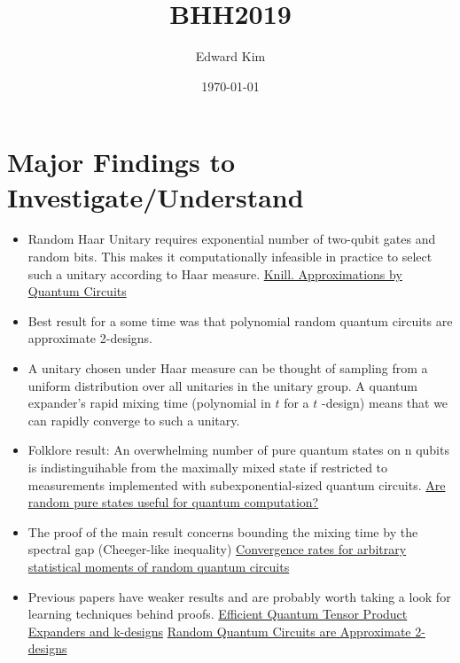 \documentclass[a4paper]{article}
\author{Edward Kim}
\date{\today}
\title{BHH2019}
\begin{document}
\maketitle
\tableofcontents


\section{Major Findings to Investigate/Understand}
\label{sec:orgac81dc7}
\begin{itemize}
\item Random Haar Unitary requires exponential number of two-qubit gates and random bits.
This makes it computationally infeasible in practice to select such a unitary according to Haar measure.
\href{https://arxiv.org/pdf/quant-ph/9508006.pdf}{Knill. Approximations by Quantum Circuits}

\item Best result for a some time was that polynomial random quantum circuits are approximate 2-designs.
\item A unitary chosen under Haar measure can be thought of sampling from a uniform distribution over all unitaries in the unitary group.
A quantum expander's rapid mixing time (polynomial in \(t\) for a \(t\) -design) means that we can rapidly converge to such a unitary.

\item Folklore result: An overwhelming number of pure quantum states on n qubits is indistinguihable from the maximally mixed state if restricted to measurements implemented with subexponential-sized quantum circuits.
\href{https://arxiv.org/pdf/0812.3001.pdf}{Are random pure states useful for quantum computation?}

\item The proof of the main result concerns bounding the mixing time by the spectral gap (Cheeger-like inequality)
\href{https://arxiv.org/pdf/0910.0913.pdf}{Convergence rates for arbitrary statistical moments of random quantum circuits}
\item Previous papers have weaker results and are probably worth taking a look for learning techniques behind proofs.
\href{https://arxiv.org/pdf/0811.2597.pdf}{Efficient Quantum Tensor Product Expanders and k-designs}
\href{https://link.springer.com/content/pdf/10.1007/s00220-009-0873-6.pdf}{Random Quantum Circuits are Approximate 2-designs}
\end{itemize}
\end{document}
